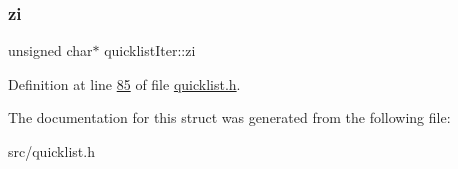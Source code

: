 \subsubsection{\texorpdfstring{zi}{zi}}
{\footnotesize\ttfamily unsigned char$\ast$ quicklist\+Iter\+::zi}



Definition at line \hyperlink{quicklist_8h_source_l00085}{85} of file \hyperlink{quicklist_8h_source}{quicklist.\+h}.



The documentation for this struct was generated from the following file\+:\begin{DoxyCompactItemize}
\item 
src/quicklist.\+h\end{DoxyCompactItemize}
